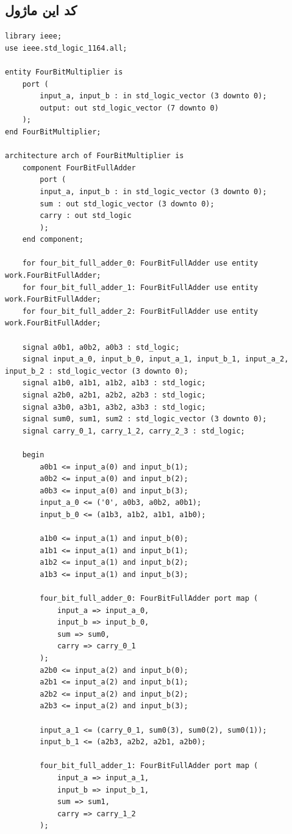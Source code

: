 \documentclass[dvipsnames, svgnames, x11names, a4paper, 11pt, oneside]{book}
\begin{document}
				\subsection{کد این ماژول}
					\begin{latin}
						
						\begin{lstlisting}
library ieee;
use ieee.std_logic_1164.all;

entity FourBitMultiplier is
	port (
		input_a, input_b : in std_logic_vector (3 downto 0);
		output: out std_logic_vector (7 downto 0)
	);
end FourBitMultiplier;

architecture arch of FourBitMultiplier is
	component FourBitFullAdder
		port (
		input_a, input_b : in std_logic_vector (3 downto 0);
		sum : out std_logic_vector (3 downto 0);
		carry : out std_logic
		);
	end component;
	
	for four_bit_full_adder_0: FourBitFullAdder use entity work.FourBitFullAdder;
	for four_bit_full_adder_1: FourBitFullAdder use entity work.FourBitFullAdder;
	for four_bit_full_adder_2: FourBitFullAdder use entity work.FourBitFullAdder;
	
	signal a0b1, a0b2, a0b3 : std_logic;
	signal input_a_0, input_b_0, input_a_1, input_b_1, input_a_2, input_b_2 : std_logic_vector (3 downto 0);
	signal a1b0, a1b1, a1b2, a1b3 : std_logic;
	signal a2b0, a2b1, a2b2, a2b3 : std_logic;
	signal a3b0, a3b1, a3b2, a3b3 : std_logic;
	signal sum0, sum1, sum2 : std_logic_vector (3 downto 0);
	signal carry_0_1, carry_1_2, carry_2_3 : std_logic;
	
	begin
		a0b1 <= input_a(0) and input_b(1);
		a0b2 <= input_a(0) and input_b(2);
		a0b3 <= input_a(0) and input_b(3);
		input_a_0 <= ('0', a0b3, a0b2, a0b1);
		input_b_0 <= (a1b3, a1b2, a1b1, a1b0);
	
		a1b0 <= input_a(1) and input_b(0);
		a1b1 <= input_a(1) and input_b(1);
		a1b2 <= input_a(1) and input_b(2);
		a1b3 <= input_a(1) and input_b(3);
	
		four_bit_full_adder_0: FourBitFullAdder port map (
			input_a => input_a_0,
			input_b => input_b_0,
			sum => sum0,
			carry => carry_0_1
		);
		a2b0 <= input_a(2) and input_b(0);
		a2b1 <= input_a(2) and input_b(1);
		a2b2 <= input_a(2) and input_b(2);
		a2b3 <= input_a(2) and input_b(3);
		
		input_a_1 <= (carry_0_1, sum0(3), sum0(2), sum0(1));
		input_b_1 <= (a2b3, a2b2, a2b1, a2b0);
		
		four_bit_full_adder_1: FourBitFullAdder port map (
			input_a => input_a_1,
			input_b => input_b_1,
			sum => sum1,
			carry => carry_1_2
		);
	

\end{lstlisting}
\end{latin}
\end{document}
